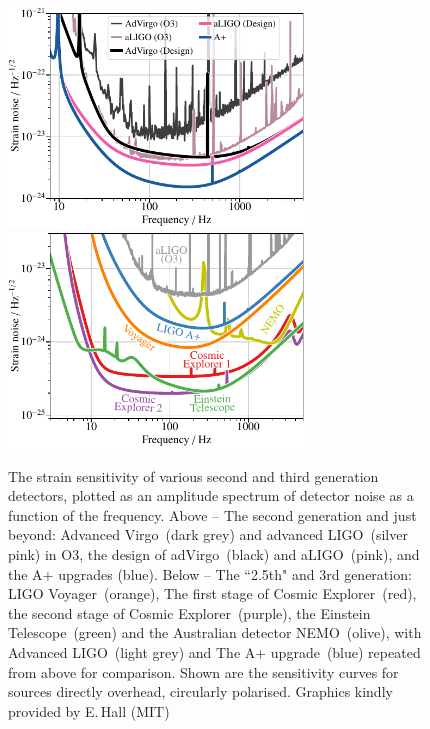 \documentclass[graybox, nosecnum]{svmult}
\begin{document}
\begin{figure}[!ht]
    \centering
    \includegraphics[width=0.7\textwidth]{Figures/advirgoO3_aligoO3_advirgo_aligo_aplus.pdf}
   \includegraphics[width=0.7\textwidth]{Figures/aligoO3_aplus_voy_ce1_ce2_et_nemo.pdf}
    \caption{
    The strain sensitivity of various second and third generation detectors, plotted as an amplitude spectrum of detector noise as a function of the frequency. 
    Above -- The second generation and just beyond: Advanced Virgo~(dark grey) and advanced LIGO~(silver pink) in O3, the design of adVirgo~(black) and aLIGO~(pink), and the A+ upgrades (blue). 
    Below -- The ``2.5th" and 3rd generation:  
    LIGO Voyager~(orange), The first stage of Cosmic Explorer~(red), the second stage of Cosmic Explorer~(purple), the Einstein Telescope~(green) and the Australian detector NEMO~(olive), with Advanced LIGO~(light grey) and The A+ upgrade~(blue) repeated from above for comparison. Shown are the sensitivity curves for sources directly overhead, circularly polarised.
\hspace{\textwidth}
Graphics kindly provided by E.\,Hall (MIT)}
\label{fig:2G-3G_curves}
\end{figure}
\end{document}
